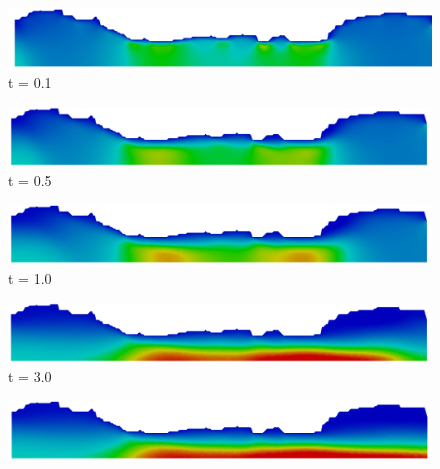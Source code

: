 \vspace{2cm} 
\begin{figure}[H]
     \begin{minipage}{.50\linewidth}
      \centering
      \includegraphics[scale=0.12]{./02_chaps/cap_solution/figure/vel_Real200.png}\\
      t = 0.1
     \end{minipage}%
     \begin{minipage}{.50\linewidth}
      \centering
      \includegraphics[scale=0.12]{./02_chaps/cap_solution/figure/vel_Real1000.png}\\
      t = 0.5
     \end{minipage}
     \begin{minipage}{.50\linewidth}
     \medskip
      \centering
      \includegraphics[scale=0.12]{./02_chaps/cap_solution/figure/vel_Real2000.png}\\
      t = 1.0
     \end{minipage}%
     \begin{minipage}{.50\linewidth}
     \medskip
      \centering
      \includegraphics[scale=0.12]{./02_chaps/cap_solution/figure/vel_Real6000.png}\\
      t = 3.0
     \end{minipage}
     \begin{minipage}{.50\linewidth}
      \centering
      \includegraphics[scale=0.12]{./02_chaps/cap_solution/figure/vel_Real8000.png}\\

\end{minipage}
\end{figure}
